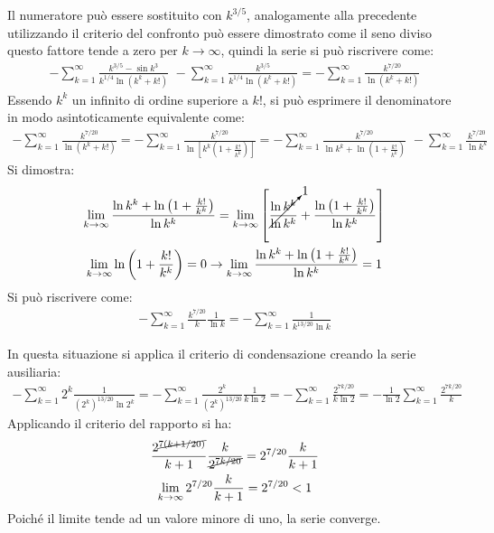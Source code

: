 \documentclass{article}
\numberwithin{equation}{subsection}
\begin{document}
Il numeratore può essere sostituito con $k^{3/5}$, analogamente alla precedente utilizzando il criterio del confronto può essere dimostrato come il seno diviso questo fattore tende a zero per $k\to\infty$, quindi la serie si può riscrivere come:
\begin{gather*}
    -\displaystyle\sum_{k=1}^\infty\frac{k^{3/5}-\sin k^3}{k^{1/4}\ln(k^k+k!)}\mbox{~}
    -\displaystyle\sum_{k=1}^\infty\frac{k^{3/5}}{k^{1/4}\ln(k^k+k!)}=
    -\displaystyle\sum_{k=1}^\infty \frac{k^{7/20}}{\ln(k^k+k!)}
\end{gather*}
Essendo $k^k$ un infinito di ordine superiore a $k!$, si può esprimere il denominatore in modo asintoticamente equivalente come:
\begin{gather*}
    -\displaystyle\sum_{k=1}^\infty \frac{k^{7/20}}{\ln(k^k+k!)}=
    -\displaystyle\sum_{k=1}^\infty \frac{k^{7/20}}{\ln\left[k^k\left(1+\frac{k!}{k^k}\right)\right]}=
    -\displaystyle\sum_{k=1}^\infty \frac{k^{7/20}}{\ln k^k+\ln\left(1+\frac{k!}{k^k}\right)}\mbox{~}
    -\displaystyle\sum_{k=1}^\infty \frac{k^{7/20}}{\ln k^k}    
\end{gather*}
Si dimostra:
\begin{gather*}
    \lim_{k\to\infty}\frac{\ln k^k+\ln\left(1+\frac{k!}{k^k}\right)}{\ln k^k}=
    \lim_{k\to\infty}\left[\cancelto{1}{\frac{\ln k^k}{\ln k^k}}+\frac{\ln\left(1+\frac{k!}{k^k}\right)}{\ln k^k}\right]\\
    \lim_{k\to\infty}\ln\left(1+\frac{k!}{k^k}\right)=0\rightarrow
    \lim_{k\to\infty}\frac{\ln k^k+\ln\left(1+\frac{k!}{k^k}\right)}{\ln k^k}=1
\end{gather*}
Si può riscrivere come:
\begin{gather*}
    -\displaystyle\sum_{k=1}^\infty\frac{k^{7/20}}{k}\frac{1}{\ln k}=
    -\displaystyle\sum_{k=1}^\infty\frac{1}{k^{13/20}\ln k}
\end{gather*}

In questa situazione si applica il criterio di condensazione creando la serie ausiliaria:
\begin{gather*}
    -\displaystyle\sum_{k=1}^\infty2^k\frac{1}{(2^k)^{13/20}\ln 2^k}=
    -\displaystyle\sum_{k=1}^\infty\frac{2^k}{(2^k)^{13/20}}\frac{1}{k\ln 2}=
    -\displaystyle\sum_{k=1}^\infty\frac{2^{7k/20}}{k\ln 2}=-\frac{1}{\ln 2}\sum_{k=1}^\infty\frac{2^{7k/20}}{k}
\end{gather*}
Applicando il criterio del rapporto si ha:
\begin{gather*}
    \displaystyle\frac{2^{\cancel{7(k+1/20)}}}{k+1}\frac{k}{\cancel{2^{7k/20}}}=2^{7/20}\frac{k}{k+1}\\
    \lim_{k\to\infty}2^{7/20}\frac{k}{k+1}=2^{7/20}<1
\end{gather*}
Poiché il limite tende ad un valore minore di uno, la serie converge. 
\end{document}
